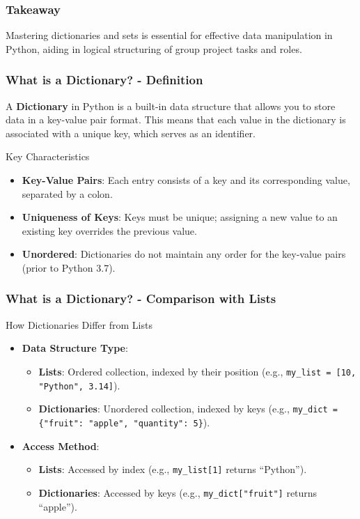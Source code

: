 \documentclass{beamer}
\begin{document}
\begin{frame}[fragile]
    \frametitle{Takeaway}
    Mastering dictionaries and sets is essential for effective data manipulation in Python, aiding in logical structuring of group project tasks and roles.
\end{frame}

\begin{frame}[fragile]
    \frametitle{What is a Dictionary? - Definition}
    A \textbf{Dictionary} in Python is a built-in data structure that allows you to store data in a key-value pair format. This means that each value in the dictionary is associated with a unique key, which serves as an identifier.
    
    \begin{block}{Key Characteristics}
        \begin{itemize}
            \item \textbf{Key-Value Pairs}: Each entry consists of a key and its corresponding value, separated by a colon. 
            \item \textbf{Uniqueness of Keys}: Keys must be unique; assigning a new value to an existing key overrides the previous value.
            \item \textbf{Unordered}: Dictionaries do not maintain any order for the key-value pairs (prior to Python 3.7).
        \end{itemize}
    \end{block}
\end{frame}

\begin{frame}[fragile]
    \frametitle{What is a Dictionary? - Comparison with Lists}
    \begin{block}{How Dictionaries Differ from Lists}
        \begin{itemize}
            \item \textbf{Data Structure Type}:
                \begin{itemize}
                    \item \textbf{Lists}: Ordered collection, indexed by their position (e.g., \texttt{my\_list = [10, "Python", 3.14]}).
                    \item \textbf{Dictionaries}: Unordered collection, indexed by keys (e.g., \texttt{my\_dict = \{"fruit": "apple", "quantity": 5\}}).
                \end{itemize}
            \item \textbf{Access Method}:
                \begin{itemize}
                    \item \textbf{Lists}: Accessed by index (e.g., \texttt{my\_list[1]} returns ``Python'').
                    \item \textbf{Dictionaries}: Accessed by keys (e.g., \texttt{my\_dict["fruit"]} returns ``apple'').
                \end{itemize}
        \end{itemize}
    \end{block}
\end{frame}
\end{document}
